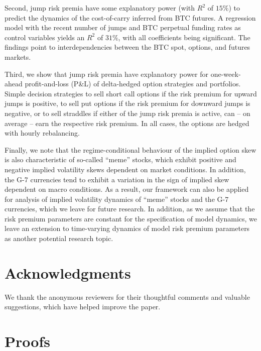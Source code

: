 \documentclass[11pt,a4paper]{article}
\numberwithin{equation}{section}
\theoremstyle{remark}
\theoremstyle{definition}
\begin{document}
Second, jump risk premia have some explanatory power (with $R^2$ of $15\%$) to predict the dynamics of the cost-of-carry inferred from BTC futures.
A regression model with the recent number of jumps and BTC perpetual funding rates as control variables yields an $R^2$ of $31\%$, with all coefficients being significant. The findings point to interdependencies between the BTC spot, options, and futures markets.

Third, we show that jump risk premia have explanatory power for one-week-ahead profit-and-loss (P\&L) of delta-hedged option strategies and portfolios. Simple decision strategies to sell short call options if the risk premium for upward jumps is positive, to sell put options if the risk premium for downward jumps is negative, or to sell straddles if either of the jump risk premia is active, can -- on average -- earn the respective risk premium. In all cases, the options are hedged with hourly rebalancing.

Finally, we note that the regime-conditional behaviour of the implied option skew is also characteristic of so-called ``meme'' stocks, which exhibit positive and negative implied volatility skews dependent on market conditions.
In addition, the G-7 currencies tend to exhibit a variation in the sign of implied skew dependent on macro conditions.
As a result, our framework can also be applied for analysis of implied volatility dynamics of ``meme'' stocks and the G-7 currencies, which we leave for future research.
In addition, as we assume that the risk premium parameters are constant for the specification of model dynamics,
we leave an extension to time-varying dynamics of model risk premium parameters as another potential research topic.

\section*{Acknowledgments}
We thank the anonymous reviewers for their thoughtful comments and valuable suggestions, which have helped improve the paper.



\newpage
\appendix

\section{Proofs}\label{sec:proofs}
\end{document}
